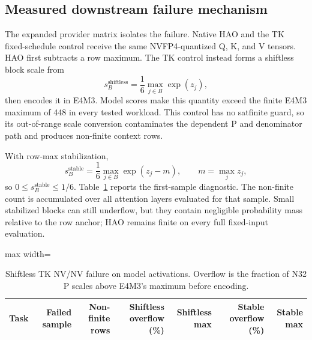 \subsection{Measured downstream failure mechanism}
\label{app:nvnv-failure}

The expanded provider matrix isolates the failure. Native HAO and the TK
fixed-schedule control receive the same NVFP4-quantized Q, K, and V tensors.
HAO first subtracts a row maximum. The TK control instead forms a shiftless
block scale from
\begin{equation}
  s_B^{\mathrm{shiftless}}
  = \frac{1}{6}\max_{j\in B}\exp(z_j),
\end{equation}
then encodes it in E4M3. Model scores make this quantity exceed the finite
E4M3 maximum of 448 in every tested workload. This control has no
satfinite guard, so its out-of-range scale conversion contaminates the
dependent P and denominator path and produces non-finite context rows.

With row-max stabilization,
\begin{equation}
  s_B^{\mathrm{stable}}
  = \frac{1}{6}\max_{j\in B}\exp(z_j-m),
  \qquad m=\max_j z_j,
\end{equation}
so $0\le s_B^{\mathrm{stable}}\le 1/6$. Table~\ref{tab:nvnv-failure}
reports the first-sample diagnostic. The non-finite count is accumulated
over all attention layers evaluated for that sample. Small stabilized blocks
can still underflow, but they contain negligible probability mass relative
to the row anchor; HAO remains finite on every full fixed-input evaluation.

\begin{table}[htbp]
\centering
\caption{Shiftless TK NV/NV failure on model activations. Overflow is the
fraction of N32 P scales above E4M3's maximum before encoding.}
\label{tab:nvnv-failure}
\scriptsize
\begin{adjustbox}{max width=\textwidth}
\begin{tabular}{lrrrrrr}
\toprule
Task & Failed sample & Non-finite rows & Shiftless overflow (\%)
& Shiftless max & Stable overflow (\%) & Stable max \\
\midrule
%
\end{tabular}
\end{adjustbox}
\end{table}
